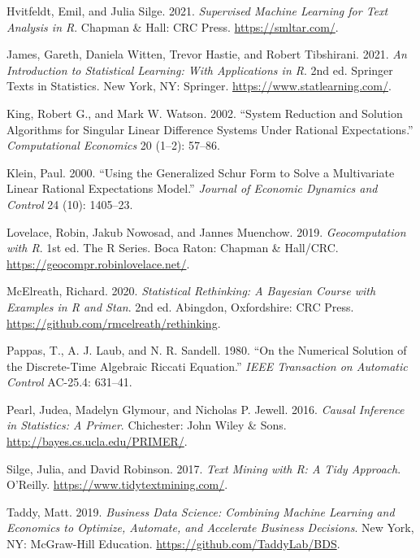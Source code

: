 \documentclass[
  letterpaper,
]{book}
\newlength{\cslhangindent}
\newlength{\cslentryspacingunit} %
\newenvironment{CSLReferences}[2] %
 {%
  \setlength{\parindent}{0pt}
  \ifodd #1
  \let\oldpar\par
  \def\par{\hangindent=\cslhangindent\oldpar}
  \fi
  \setlength{\parskip}{#2\cslentryspacingunit}
 }%
 {}
\begin{document}
\begin{CSLReferences}{1}{0}
\leavevmode{}%
Hvitfeldt, Emil, and Julia Silge. 2021. \emph{Supervised Machine
Learning for Text Analysis in {R}}. Chapman \& Hall: CRC Press.
\url{https://smltar.com/}.

\leavevmode{}%
James, Gareth, Daniela Witten, Trevor Hastie, and Robert Tibshirani.
2021. \emph{An Introduction to Statistical Learning: With Applications
in {R}}. 2nd ed. Springer Texts in Statistics. New York, NY: Springer.
\url{https://www.statlearning.com/}.

\leavevmode{}%
King, Robert G., and Mark W. Watson. 2002. {``System Reduction and
Solution Algorithms for Singular Linear Difference Systems Under
Rational Expectations.''} \emph{Computational Economics} 20 (1--2):
57--86.

\leavevmode{}%
Klein, Paul. 2000. {``Using the Generalized {S}chur Form to Solve a
Multivariate Linear Rational Expectations Model.''} \emph{Journal of
Economic Dynamics and Control} 24 (10): 1405--23.

\leavevmode{}%
Lovelace, Robin, Jakub Nowosad, and Jannes Muenchow. 2019.
\emph{Geocomputation with {R}}. 1st ed. The {R} Series. Boca Raton:
Chapman \& Hall/CRC. \url{https://geocompr.robinlovelace.net/}.

\leavevmode{}%
McElreath, Richard. 2020. \emph{Statistical Rethinking: A Bayesian
Course with Examples in {R} and Stan}. 2nd ed. Abingdon, Oxfordshire:
CRC Press. \url{https://github.com/rmcelreath/rethinking}.

\leavevmode{}%
Pappas, T., A. J. Laub, and N. R. Sandell. 1980. {``On the Numerical
Solution of the Discrete-Time Algebraic Riccati Equation.''} \emph{IEEE
Transaction on Automatic Control} AC-25.4: 631--41.

\leavevmode{}%
Pearl, Judea, Madelyn Glymour, and Nicholas P. Jewell. 2016.
\emph{Causal Inference in Statistics: A Primer}. Chichester: John Wiley
\& Sons. \url{http://bayes.cs.ucla.edu/PRIMER/}.

\leavevmode{}%
Silge, Julia, and David Robinson. 2017. \emph{Text Mining with {R}: A
{T}idy Approach}. O'Reilly. \url{https://www.tidytextmining.com/}.

\leavevmode{}%
Taddy, Matt. 2019. \emph{Business Data Science: Combining Machine
Learning and Economics to Optimize, Automate, and Accelerate Business
Decisions}. New York, NY: McGraw-Hill Education.
\url{https://github.com/TaddyLab/BDS}.


\end{CSLReferences}
\end{document}
